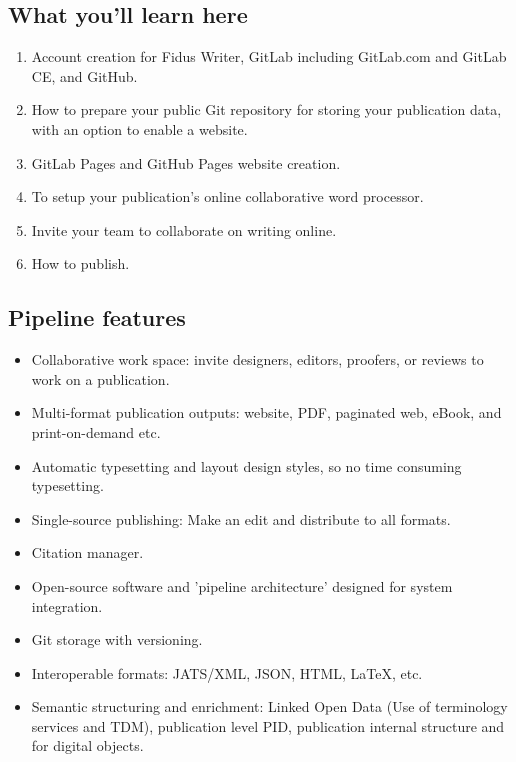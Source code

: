 \documentclass{article}
\begin{document}
\subsection{What you'll learn here}\label{H7757657}


\begin{enumerate}
\item Account creation for Fidus Writer, GitLab including GitLab.com and GitLab CE, and GitHub.


\item How to prepare your public Git repository for storing your publication data, with an option to enable a website.


\item GitLab Pages and GitHub Pages website creation.


\item To setup your publication's online collaborative word processor.


\item Invite your team to collaborate on writing online.


\item How to publish.


\end{enumerate}

\subsection{Pipeline features}\label{H2087393}


\begin{itemize}
\item Collaborative work space: invite designers, editors, proofers, or reviews to work on a publication.


\item Multi-format publication outputs: website, PDF, paginated web, eBook, and print-on-demand etc.


\item Automatic typesetting and layout design styles, so no time consuming typesetting.


\item Single-source publishing: Make an edit and distribute to all formats.


\item Citation manager.


\item Open-source software and 'pipeline architecture' designed for system integration.


\item Git storage with versioning.


\item Interoperable formats: JATS/XML, JSON, HTML, LaTeX, etc.


\item Semantic structuring and enrichment: Linked Open Data (Use of terminology services and TDM), publication level PID, publication internal structure and for digital objects.


\end{itemize}
\end{document}
